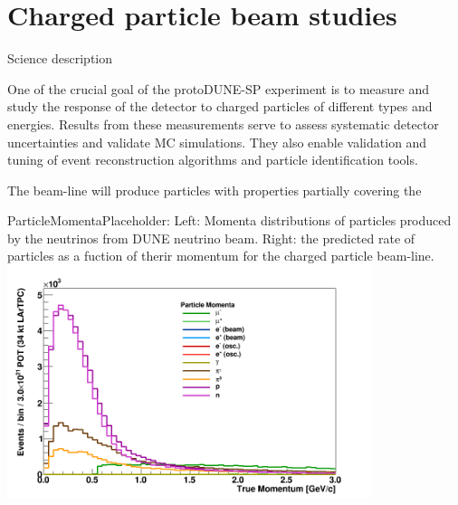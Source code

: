 
\section{Charged particle beam studies}
Science description


One of the crucial goal of the protoDUNE-SP experiment is to measure and study the response of the detector to charged
particles of different types and energies. Results from these measurements serve to
assess systematic detector uncertainties and validate MC simulations. They also enable
validation and tuning of event reconstruction algorithms and particle identification tools.

The beam-line will produce particles with properties partially covering the 

\begin{cdrfigure}[Placeholder ]{ParticleMomenta}{Placeholder: Left: Momenta distributions of particles produced by the neutrinos from DUNE neutrino beam. Right: the predicted rate of particles as a fuction of therir momentum for the charged particle beam-line.}
  \includegraphics[width=0.8\textwidth]{figures/Momenta_per_Particle}
\end{cdrfigure}

